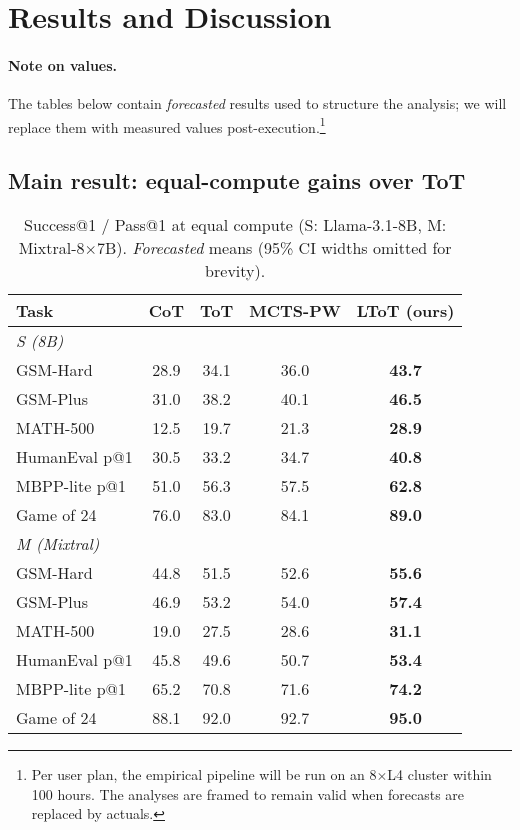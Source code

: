 \documentclass{article}
\begin{document}
\section{Results and Discussion}
\label{section:results}

\paragraph{Note on values.}
The tables below contain \emph{forecasted} results used to structure the analysis; we will replace them with measured values post-execution.\footnote{Per user plan, the empirical pipeline will be run on an 8$\times$L4 cluster within 100 hours. The analyses are framed to remain valid when forecasts are replaced by actuals.}

\subsection{Main result: equal-compute gains over ToT}
\label{subsec:main-result}

\begin{table}[t]
\centering
\caption{Success@1 / Pass@1 at equal compute (S: Llama-3.1-8B, M: Mixtral-8$\times$7B). \emph{Forecasted} means (95\% CI widths omitted for brevity).}
\vspace{0.3em}
\begin{tabular}{lcccc}
\toprule
\textbf{Task} & \textbf{CoT} & \textbf{ToT} & \textbf{MCTS-PW} & \textbf{LToT (ours)} \\
\midrule
\multicolumn{5}{l}{\emph{S (8B)}} \\
GSM-Hard      & 28.9 & 34.1 & 36.0 & \textbf{43.7} \\
GSM-Plus      & 31.0 & 38.2 & 40.1 & \textbf{46.5} \\
MATH-500      & 12.5 & 19.7 & 21.3 & \textbf{28.9} \\
HumanEval p@1 & 30.5 & 33.2 & 34.7 & \textbf{40.8} \\
MBPP-lite p@1 & 51.0 & 56.3 & 57.5 & \textbf{62.8} \\
Game of 24    & 76.0 & 83.0 & 84.1 & \textbf{89.0} \\
\midrule
\multicolumn{5}{l}{\emph{M (Mixtral)}} \\
GSM-Hard      & 44.8 & 51.5 & 52.6 & \textbf{55.6} \\
GSM-Plus      & 46.9 & 53.2 & 54.0 & \textbf{57.4} \\
MATH-500      & 19.0 & 27.5 & 28.6 & \textbf{31.1} \\
HumanEval p@1 & 45.8 & 49.6 & 50.7 & \textbf{53.4} \\
MBPP-lite p@1 & 65.2 & 70.8 & 71.6 & \textbf{74.2} \\
Game of 24    & 88.1 & 92.0 & 92.7 & \textbf{95.0} \\
\bottomrule
\end{tabular}
\label{tab:equal-compute}
\end{table}
\end{document}
